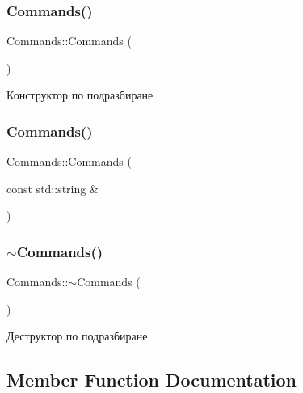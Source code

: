 \subsubsection{\texorpdfstring{Commands()}{Commands()}\hspace{0.1cm}{\footnotesize\ttfamily [1/2]}}
{\footnotesize\ttfamily Commands\+::\+Commands (\begin{DoxyParamCaption}{ }\end{DoxyParamCaption})\hspace{0.3cm}{\ttfamily [default]}}



Конструктор по подразбиране 

\mbox{\label{class_commands_a50e97e2c1cc38b6b84252cac9af09f3d}} 
\subsubsection{\texorpdfstring{Commands()}{Commands()}\hspace{0.1cm}{\footnotesize\ttfamily [2/2]}}
{\footnotesize\ttfamily Commands\+::\+Commands (\begin{DoxyParamCaption}\item[{const std\+::string \&}]{ }\end{DoxyParamCaption})\hspace{0.3cm}{\ttfamily [delete]}}

\mbox{\label{class_commands_a9c7815d0cedea1ccbac72eadc4bcab2d}} 
\subsubsection{\texorpdfstring{$\sim$\+Commands()}{~Commands()}}
{\footnotesize\ttfamily Commands\+::$\sim$\+Commands (\begin{DoxyParamCaption}{ }\end{DoxyParamCaption})\hspace{0.3cm}{\ttfamily [default]}}



Деструктор по подразбиране 



\subsection{Member Function Documentation}
\mbox{\label{class_commands_a97f3494ce4d8e6a68ca2746b60decc37}} 
